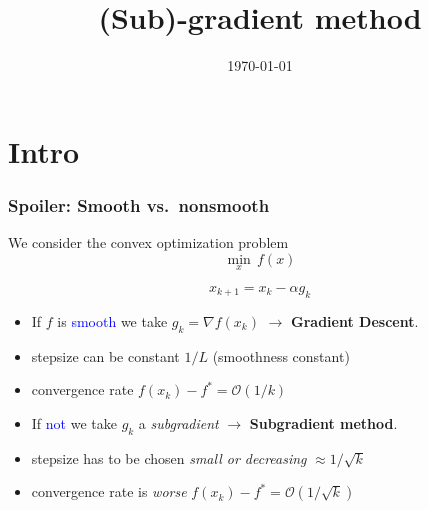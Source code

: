 \documentclass{beamer}
\title{(Sub)-gradient method}
\date{\today}
\begin{document}
\maketitle
\frame{\tableofcontents}

\section{Intro}%

\begin{frame}
  \frametitle{Spoiler: Smooth vs.\ nonsmooth}
  We consider the convex optimization problem
  \begin{equation}
    \min_x \, f(x)
  \end{equation}
  \vspace{-0.5cm}
  \begin{block}{}
    \begin{equation}
      x_{k+1} = x_k - \alpha g_k
    \end{equation}
  \end{block}
  \begin{adjustwidth}{-1.5em}{-1.5em}
    \begin{minipage}{0.52\textwidth}
      \begin{block}{}
        \begin{itemize}
          \item If $f$ is \textcolor{blue}{smooth} we take $g_k = \nabla f(x_k)$ $\rightarrow$ \textbf{Gradient Descent}.
          \item stepsize can be constant $1/L$ (smoothness constant)
          \item convergence rate $f(x_k)-f^* = \mathcal{O}(1/k)$
        \end{itemize}
      \end{block}
    \end{minipage}
    \hfill
    \begin{minipage}{0.52\textwidth}
      \begin{block}{}
        \begin{itemize}
          \item If \textcolor{blue}{not} we take $g_k$ a \textit{subgradient} $\rightarrow$ \textbf{Subgradient method}.
          \item stepsize has to be chosen \emph{small or decreasing} $\approx 1/\sqrt{k}$
          \item convergence rate is \emph{worse} $f(x_k)-f^* = \mathcal{O}(1/\sqrt{k})$
        \end{itemize}
      \end{block}
    \end{minipage}
  \end{adjustwidth}
\end{frame}
\end{document}
